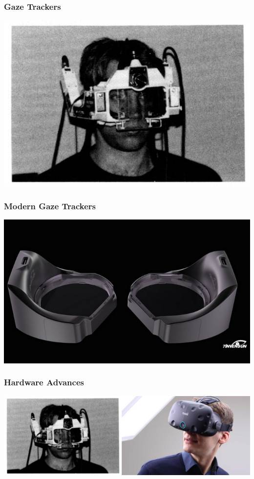 \documentclass{beamer}
\begin{document}
\begin{frame}
  \frametitle{Gaze Trackers}
  
  	\begin{center}
    		\includegraphics[width=.70\textwidth]{Illustrations/gazeTracker.png}
  	\end{center}
  
\end{frame}

\begin{frame}
  \frametitle{Modern Gaze Trackers}
  
  	\begin{center}
    		\includegraphics[width=.75\textwidth]{Illustrations/7invensun_aglass2.png}
  	\end{center}
  
\end{frame}

\begin{frame}
  \frametitle{Hardware Advances}
  
  	\begin{center}
    		\includegraphics[width=.85\textwidth]{Illustrations/tobii_NAC.png}
  	\end{center}
  
\end{frame}
\end{document}
